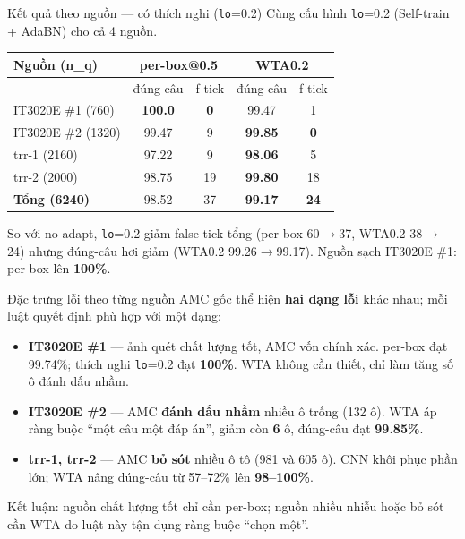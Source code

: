 \documentclass{beamer}
\newcommand{\hl}[1]{\textbf{#1}}
\begin{document}
\begin{frame}{Kết quả theo nguồn --- có thích nghi (\texttt{lo}=0.2)}
\footnotesize
Cùng cấu hình \texttt{lo}=0.2 (Self-train + AdaBN) cho cả 4 nguồn.
\begin{center}
\begin{tabular}{|l|c|c|c|c|}
\hline
\textbf{Nguồn (n\_q)} &
\multicolumn{2}{c|}{\textbf{per-box@0.5}} &
\multicolumn{2}{c|}{\textbf{WTA0.2}} \\
\hline
 & đúng-câu & f-tick & đúng-câu & f-tick \\
\hline
IT3020E \#1 (760) & \hl{100.0} & \hl{0} & 99.47 & 1 \\
\hline
IT3020E \#2 (1320) & 99.47 & 9 & \hl{99.85} & \hl{0} \\
\hline
trr-1 (2160) & 97.22 & 9 & \hl{98.06} & 5 \\
\hline
trr-2 (2000) & 98.75 & 19 & \hl{99.80} & 18 \\
\hline
\hl{Tổng (6240)} & 98.52 & 37 & \hl{99.17} & \hl{24} \\
\hline
\end{tabular}
\end{center}
\vspace{0.1cm}
{\scriptsize So với no-adapt, \texttt{lo}=0.2 giảm false-tick tổng (per-box 60$\to$37, WTA0.2 38$\to$24) nhưng đúng-câu hơi giảm (WTA0.2 99.26$\to$99.17). Nguồn sạch IT3020E \#1: per-box lên \hl{100\%}.}
\end{frame}

\begin{frame}{Đặc trưng lỗi theo từng nguồn}
\footnotesize
AMC gốc thể hiện \hl{hai dạng lỗi} khác nhau; mỗi luật quyết định phù hợp với một dạng:
\begin{itemize}
    \item \hl{IT3020E \#1} --- ảnh quét chất lượng tốt, AMC vốn chính xác. per-box đạt 99.74\%; thích nghi \texttt{lo}=0.2 đạt \hl{100\%}. WTA không cần thiết, chỉ làm tăng số ô đánh dấu nhầm.
    \item \hl{IT3020E \#2} --- AMC \hl{đánh dấu nhầm} nhiều ô trống (132 ô). WTA áp ràng buộc ``một câu một đáp án'', giảm còn \hl{6} ô, đúng-câu đạt \hl{99.85\%}.
    \item \hl{trr-1, trr-2} --- AMC \hl{bỏ sót} nhiều ô tô (981 và 605 ô). CNN khôi phục phần lớn; WTA nâng đúng-câu từ 57--72\% lên \hl{98--100\%}.
\end{itemize}
\vspace{0.1cm}
{\footnotesize Kết luận: nguồn chất lượng tốt chỉ cần per-box; nguồn nhiều nhiễu hoặc bỏ sót cần WTA do luật này tận dụng ràng buộc ``chọn-một''.}
\end{frame}
\end{document}
